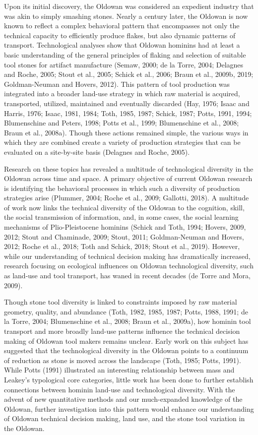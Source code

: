 \documentclass[]{elsarticle} %
\begin{document}
Upon its initial discovery, the Oldowan was considered an expedient
industry that was akin to simply smashing stones. Nearly a century
later, the Oldowan is now known to reflect a complex behavioral pattern
that encompasses not only the technical capacity to efficiently produce
flakes, but also dynamic patterns of transport. Technological analyses
show that Oldowan hominins had at least a basic understanding of the
general principles of flaking and selection of suitable tool stones for
artifact manufacture (Semaw, 2000; de la Torre, 2004; Delagnes and
Roche, 2005; Stout et al., 2005; Schick et al., 2006; Braun et al.,
2009b, 2019; Goldman-Neuman and Hovers, 2012). This pattern of tool
production was integrated into a broader land-use strategy in which raw
material is acquired, transported, utilized, maintained and eventually
discarded (Hay, 1976; Isaac and Harris, 1976; Isaac, 1981, 1984; Toth,
1985, 1987; Schick, 1987; Potts, 1991, 1994; Blumenschine and Peters,
1998; Potts et al., 1999; Blumenschine et al., 2008; Braun et al.,
2008a). Though these actions remained simple, the various ways in which
they are combined create a variety of production strategies that can be
evaluated on a site-by-site basis (Delagnes and Roche, 2005).

Research on these topics has revealed a multitude of technological
diversity in the Oldowan across time and space. A primary objective of
current Oldowan research is identifying the behavioral processes in
which such a diversity of production strategies arise (Plummer, 2004;
Roche et al., 2009; Gallotti, 2018). A multitude of work now links the
technical diversity of the Oldowan to the cognition, skill, the social
transmission of information, and, in some cases, the social learning
mechanisms of Plio-Pleistocene hominins (Schick and Toth, 1994; Hovers,
2009, 2012; Stout and Chaminade, 2009; Stout, 2011; Goldman-Neuman and
Hovers, 2012; Roche et al., 2018; Toth and Schick, 2018; Stout et al.,
2019). However, while our understanding of technical decision making has
dramatically increased, research focusing on ecological influences on
Oldowan technological diversity, such as land-use and tool transport,
has waned in recent decades (de Torre and Mora, 2009).

Though stone tool diversity is linked to constraints imposed by raw
material geometry, quality, and abundance (Toth, 1982, 1985, 1987;
Potts, 1988, 1991; de la Torre, 2004; Blumenschine et al., 2008; Braun
et al., 2009a), how hominin tool transport and more broadly land-use
patterns influence the technical decision making of Oldowan tool makers
remains unclear. Early work on this subject has suggested that the
technological diversity in the Oldowan points to a continuum of
reduction as stone is moved across the landscape (Toth, 1985; Potts,
1991). While Potts (1991) illustrated an interesting relationship
between mass and Leakey's typological core categories, little work has
been done to further establish connections between hominin land-use and
technological diversity. With the advent of new quantitative methods and
our much-expanded knowledge of the Oldowan, further investigation into
this pattern would enhance our understanding of Oldowan technical
decision making, land use, and the stone tool variation in the Oldowan.
\end{document}
